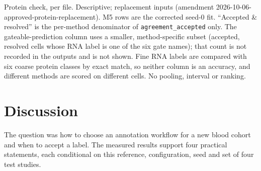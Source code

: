 \documentclass[11pt]{article}
\newcommand{\gentable}[1]{\begin{adjustbox}{max width=\textwidth,max totalheight=0.82\textheight}\end{adjustbox}}
\begin{document}
\begin{table}[t]
\centering
\caption{Protein check, per file. Descriptive; replacement inputs (amendment 2026-10-06-approved-protein-replacement). M5 rows are the corrected seed-0 fit. ``Accepted \& resolved'' is the per-method denominator of \nolinkurl{agreement_accepted} only. The gateable-prediction column uses a smaller, method-specific subset (accepted, resolved cells whose RNA label is one of the six gate names); that count is not recorded in the outputs and is not shown. Fine RNA labels are compared with six coarse protein classes by exact match, so neither column is an accuracy, and different methods are scored on different cells. No pooling, interval or ranking.}
\label{tab:protein}
\gentable{table_protein.tex}
\end{table}

\section{Discussion}

The question was how to choose an annotation workflow for a new blood cohort and when to accept a label. The measured results support four practical statements, each conditional on this reference, configuration, seed and set of four test studies.
\end{document}
